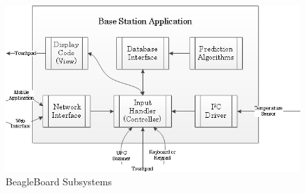 \documentclass[11pt]{article} %
\begin{document}
\begin{figure}[h!]
\vspace{0.5cm}
\begin{center}
\includegraphics[scale=0.6]{../Graphics/BaseStation}
\caption{BeagleBoard Subsystems}
\label{fig:basecode}
\end{center}
\end{figure}
\newline \quad \newline
\end{document}
